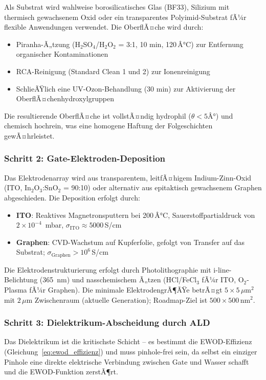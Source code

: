 ﻿\documentclass[a4paper,12pt]{scrreprt}
\theoremstyle{definition}
\begin{document}
Als Substrat wird wahlweise borosilicatisches Glas (BF33), Silizium mit
thermisch gewachsenem Oxid oder ein transparentes Polyimid-Substrat fÃ¼r
flexible Anwendungen verwendet. Die OberflÃ¤che wird durch:
\begin{itemize}
	\item Piranha-Ã„tzung (H$_2$SO$_4$/H$_2$O$_2$ = 3:1, 10 min, 120\,Â°C)
	zur Entfernung organischer Kontaminationen
	\item RCA-Reinigung (Standard Clean 1 und 2) zur Ionenreinigung
	\item SchlieÃŸlich eine UV-Ozon-Behandlung (30 min) zur Aktivierung
	der OberflÃ¤chenhydroxylgruppen
\end{itemize}
Die resultierende OberflÃ¤che ist vollstÃ¤ndig hydrophil ($\theta < 5Â°$)
und chemisch hochrein, was eine homogene Haftung der Folgeschichten gewÃ¤hrleistet.

\subsubsection{Schritt 2: Gate-Elektroden-Deposition}

Das Elektrodenarray wird aus transparentem, leitfÃ¤higem Indium-Zinn-Oxid
(ITO, In$_2$O$_3$:SnO$_2$ = 90:10) oder alternativ aus epitaktisch
gewachsenem Graphen abgeschieden. Die Deposition erfolgt durch:
\begin{itemize}
	\item \textbf{ITO}: Reaktives Magnetronsputtern bei 200\,Â°C, Sauerstoffpartialdruck
	von $2 \times 10^{-4}$\, mbar, $\sigma_{\mathrm{ITO}} \approx 5000$\,S/cm
	\item \textbf{Graphen}: CVD-Wachstum auf Kupferfolie, gefolgt von Transfer
	auf das Substrat; $\sigma_{\mathrm{Graphen}} > 10^6$\,S/cm
\end{itemize}
Die Elektrodenstrukturierung erfolgt durch Photolithographie mit i-line-Belichtung
(365\, nm) und nasschemischem Ã„tzen (HCl/FeCl$_3$ fÃ¼r ITO, O$_2$-Plasma fÃ¼r Graphen).
Die minimale ElektrodengrÃ¶ÃŸe betrÃ¤gt $5 \times 5$\,$\mu$m$^2$ mit $2$\,$\mu$m
Zwischenraum (aktuelle Generation); Roadmap-Ziel ist $500 \times 500$\,nm$^2$.

\subsubsection{Schritt 3: Dielektrikum-Abscheidung durch ALD}

Das Dielektrikum ist die kritischste Schicht -- es bestimmt die EWOD-Effizienz
(Gleichung~\ref{eq:ewod_effizienz}) und muss pinhole-frei sein, da selbst
ein einziger Pinhole eine direkte elektrische Verbindung zwischen Gate
und Wasser schafft und die EWOD-Funktion zerstÃ¶rt.
\end{document}
